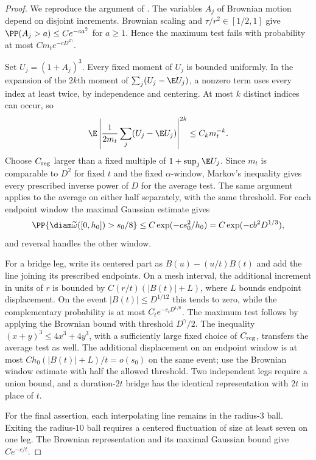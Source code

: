 \begin{proof}
We reproduce the argument of \citet[Lemma ``Free cutoff
bounds'']{HS}.  The variables $A_j$ of Brownian motion depend
on disjoint increments.  Brownian scaling and
$\tau/r^2\in[1/2,1]$ give
$\PP(A_j>a)\le Ce^{-ca^2}$ for $a\ge1$.
Hence the maximum test fails with probability at most
$C m_t e^{-cD^{2\gamma}}$.

Set $U_j=(1+A_j)^3$.  Every fixed moment of $U_j$ is bounded
uniformly.  In the expansion of the $2k$th moment of
$\sum_j(U_j-\E U_j)$, a nonzero term uses every index at
least twice, by independence and centering.  At most $k$
distinct indices can occur, so
\[
 \E\left|\frac1{2m_t}\sum_j(U_j-\E U_j)\right|^{2k}
 \le C_k m_t^{-k}.
\]
Choose $C_{\rm reg}$ larger than a fixed multiple of
$1+\sup_j\E U_j$.  Since $m_t$ is comparable to $D^2$
for fixed $t$ and the fixed $\alpha$-window, Markov's
inequality gives every prescribed inverse power of $D$ for
the average test.  The same argument applies to the average
on either half separately, with the same threshold.
For each endpoint window the maximal Gaussian estimate gives
\[
 \PP\{\diam\widetilde\omega([0,h_0])>s_0/8\}
 \le C\exp(-c s_0^2/h_0)
 =C\exp(-c b^2D^{1/3}),
\]
and reversal handles the other window.

For a bridge leg, write its centered part as
$B(u)-(u/t)B(t)$ and add the line joining its prescribed
endpoints.  On a mesh interval, the additional increment in
units of $r$ is bounded by
$C(r/t)(|B(t)|+L)$, where $L$ bounds endpoint displacement.
On the event $|B(t)|\le D^{1/12}$ this tends to zero,
while the complementary probability is at most
$C_t e^{-c_tD^{1/6}}$.  The maximum test follows by applying
the Brownian bound with threshold $D^\gamma/2$.
The inequality $(x+y)^3\le4x^3+4y^3$, with a sufficiently
large fixed choice of $C_{\rm reg}$, transfers the average
test as well.  The additional displacement on an endpoint
window is at most $C h_0(|B(t)|+L)/t=o(s_0)$ on the same
event; use the Brownian window estimate with half the allowed
threshold.  Two independent legs require a union bound, and
a duration-$2t$ bridge has the identical representation with
$2t$ in place of $t$.

For the final assertion, each interpolating line remains in
the radius-$3$ ball.  Exiting the radius-$10$ ball requires
a centered fluctuation of size at least seven on one leg.
The Brownian representation and its maximal Gaussian bound
give $Ce^{-c/t}$.
\end{proof}

